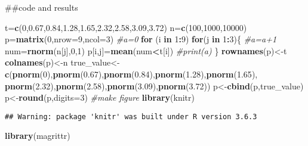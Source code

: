 \documentclass[
]{article}
\newenvironment{Shaded}{\begin{snugshade}}{\end{snugshade}}
\newcommand{\CommentTok}[1]{\textcolor[rgb]{0.56,0.35,0.01}{\textit{#1}}}
\newcommand{\ControlFlowTok}[1]{\textcolor[rgb]{0.13,0.29,0.53}{\textbf{#1}}}
\newcommand{\DataTypeTok}[1]{\textcolor[rgb]{0.13,0.29,0.53}{#1}}
\newcommand{\DecValTok}[1]{\textcolor[rgb]{0.00,0.00,0.81}{#1}}
\newcommand{\FloatTok}[1]{\textcolor[rgb]{0.00,0.00,0.81}{#1}}
\newcommand{\KeywordTok}[1]{\textcolor[rgb]{0.13,0.29,0.53}{\textbf{#1}}}
\newcommand{\NormalTok}[1]{#1}
\newcommand{\OperatorTok}[1]{\textcolor[rgb]{0.81,0.36,0.00}{\textbf{#1}}}
\begin{document}
\#\#code and results

\begin{Shaded}
\begin{Highlighting}[]
\NormalTok{t=}\KeywordTok{c}\NormalTok{(}\DecValTok{0}\NormalTok{,}\FloatTok{0.67}\NormalTok{,}\FloatTok{0.84}\NormalTok{,}\FloatTok{1.28}\NormalTok{,}\FloatTok{1.65}\NormalTok{,}\FloatTok{2.32}\NormalTok{,}\FloatTok{2.58}\NormalTok{,}\FloatTok{3.09}\NormalTok{,}\FloatTok{3.72}\NormalTok{)}
\NormalTok{n=}\KeywordTok{c}\NormalTok{(}\DecValTok{100}\NormalTok{,}\DecValTok{1000}\NormalTok{,}\DecValTok{10000}\NormalTok{)}
\NormalTok{p=}\KeywordTok{matrix}\NormalTok{(}\DecValTok{0}\NormalTok{,}\DataTypeTok{nrow=}\DecValTok{9}\NormalTok{,}\DataTypeTok{ncol=}\DecValTok{3}\NormalTok{)}
\CommentTok{#a=0}
\ControlFlowTok{for}\NormalTok{ (i }\ControlFlowTok{in} \DecValTok{1}\OperatorTok{:}\DecValTok{9}\NormalTok{)}
  \ControlFlowTok{for}\NormalTok{(j }\ControlFlowTok{in} \DecValTok{1}\OperatorTok{:}\DecValTok{3}\NormalTok{)\{}
    \CommentTok{#a=a+1}
\NormalTok{    num=}\KeywordTok{rnorm}\NormalTok{(n[j],}\DecValTok{0}\NormalTok{,}\DecValTok{1}\NormalTok{)}
\NormalTok{    p[i,j]=}\KeywordTok{mean}\NormalTok{(num}\OperatorTok{<}\NormalTok{t[i])}
    \CommentTok{#print(a)}
\NormalTok{  \}}
\KeywordTok{rownames}\NormalTok{(p)<-t}
\KeywordTok{colnames}\NormalTok{(p)<-n}
\NormalTok{true_value<-}\KeywordTok{c}\NormalTok{(}\KeywordTok{pnorm}\NormalTok{(}\DecValTok{0}\NormalTok{),}\KeywordTok{pnorm}\NormalTok{(}\FloatTok{0.67}\NormalTok{),}\KeywordTok{pnorm}\NormalTok{(}\FloatTok{0.84}\NormalTok{),}\KeywordTok{pnorm}\NormalTok{(}\FloatTok{1.28}\NormalTok{),}\KeywordTok{pnorm}\NormalTok{(}\FloatTok{1.65}\NormalTok{),}
           \KeywordTok{pnorm}\NormalTok{(}\FloatTok{2.32}\NormalTok{),}\KeywordTok{pnorm}\NormalTok{(}\FloatTok{2.58}\NormalTok{),}\KeywordTok{pnorm}\NormalTok{(}\FloatTok{3.09}\NormalTok{),}\KeywordTok{pnorm}\NormalTok{(}\FloatTok{3.72}\NormalTok{))}
\NormalTok{p<-}\KeywordTok{cbind}\NormalTok{(p,true_value)}
\NormalTok{p<-}\KeywordTok{round}\NormalTok{(p,}\DataTypeTok{digits=}\DecValTok{3}\NormalTok{)}
\CommentTok{#make figure}
\KeywordTok{library}\NormalTok{(knitr)}
\end{Highlighting}
\end{Shaded}

\begin{verbatim}
## Warning: package 'knitr' was built under R version 3.6.3
\end{verbatim}

\begin{Shaded}
\begin{Highlighting}[]
\KeywordTok{library}\NormalTok{(magrittr)}
\end{Highlighting}
\end{Shaded}
\end{document}
